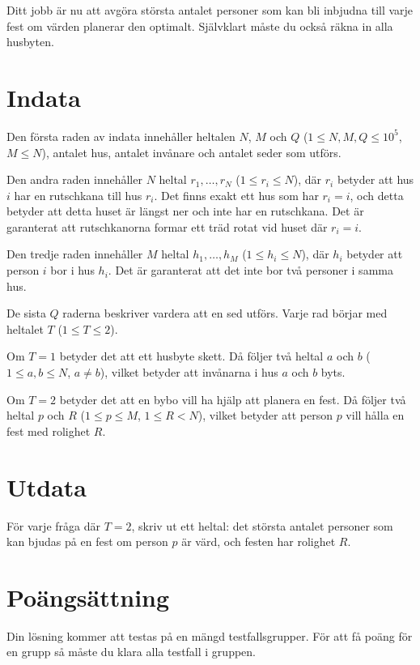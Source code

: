 Ditt jobb är nu att avgöra största antalet personer som kan bli inbjudna till varje fest om värden planerar den optimalt.
Självklart måste du också räkna in alla husbyten.


\section*{Indata}
Den första raden av indata innehåller heltalen $N$, $M$ och $Q$ ($1 \leq N, M, Q \leq 10^5$, $M \leq N$),
antalet hus, antalet invånare och antalet seder som utförs.

Den andra raden innehåller $N$ heltal $r_1, \dots, r_N$ ($1 \leq r_i \leq N$),
där $r_i$ betyder att hus $i$ har en rutschkana till hus $r_i$.
Det finns exakt ett hus som har $r_i=i$, och detta betyder att detta huset är längst ner och inte har en rutschkana.
Det är garanterat att rutschkanorna formar ett träd rotat vid huset där $r_i=i$.

Den tredje raden innehåller $M$ heltal $h_1, \dots, h_M$ ($1 \leq h_i \leq N$),
där $h_i$ betyder att person $i$ bor i hus $h_i$.
Det är garanterat att det inte bor två personer i samma hus.

De sista $Q$ raderna beskriver vardera att en sed utförs. Varje rad börjar med heltalet $T$ ($1 \leq T \leq 2$).

Om $T=1$ betyder det att ett husbyte skett. Då följer två heltal $a$ och $b$ ($1 \leq a, b \leq N$, $a \neq b$),
vilket betyder att invånarna i hus $a$ och $b$ byts.

Om $T=2$ betyder det att en bybo vill ha hjälp att planera en fest. Då följer två heltal $p$ och $R$ ($1 \leq p \leq M$, $1 \leq R < N$),
vilket betyder att person $p$ vill hålla en fest med rolighet $R$.

\section*{Utdata}
För varje fråga där $T=2$, skriv ut ett heltal: det största antalet personer som kan bjudas på en fest
om person $p$ är värd, och festen har rolighet $R$.

\section*{Poängsättning}
Din lösning kommer att testas på en mängd testfallsgrupper.
För att få poäng för en grupp så måste du klara alla testfall i gruppen.

